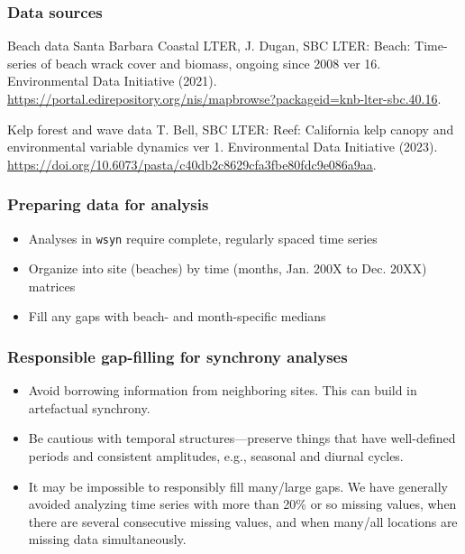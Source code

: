 \documentclass{beamer}
\begin{document}
\begin{frame}
\frametitle{Data sources}
\begin{block}{Beach data}
Santa Barbara Coastal LTER, J. Dugan, SBC LTER: Beach: Time-series of beach wrack cover and biomass, ongoing since 2008 ver 16. Environmental Data Initiative (2021). \url{https://portal.edirepository.org/nis/mapbrowse?packageid=knb-lter-sbc.40.16}.
\end{block}
\begin{block}{Kelp forest and wave data}
T. Bell, SBC LTER: Reef: California kelp canopy and environmental variable dynamics ver 1.
Environmental Data Initiative (2023). \url{https://doi.org/10.6073/pasta/c40db2c8629cfa3fbe80fdc9e086a9aa}.
\end{block}
\end{frame}

\begin{frame}
\frametitle{Preparing data for analysis}
\begin{itemize}
\item Analyses in \texttt{wsyn} require complete, regularly spaced time series
\item Organize into site (beaches) by time (months, Jan. 200X to Dec. 20XX) matrices
\item Fill any gaps with beach- and month-specific medians
\end{itemize}
\end{frame}

\begin{frame}
\frametitle{Responsible gap-filling for synchrony analyses}
\begin{itemize}
\item Avoid borrowing information from neighboring sites. This can build in artefactual synchrony.
\item Be cautious with temporal structures---preserve things that have well-defined periods and consistent amplitudes, e.g., seasonal and diurnal cycles.
\item It may be impossible to responsibly fill many/large gaps. We have generally avoided analyzing time series with more than 20\% or so missing values, when there are several consecutive missing values, and when many/all locations are missing data simultaneously.
\end{itemize}
\end{frame}
\end{document}
